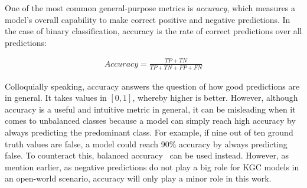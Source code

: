 One of the most common general-purpose metrics is \emph{accuracy}, which measures a model's overall capability to make correct positive and negative predictions. In the case of binary classification, accuracy is the rate of correct predictions over all predictions:

\begin{align}
    Accuracy = \frac{TP + TN}{TP + TN + FP + FN}
    \label{eq:2_basics/2_metrics/1_accuracy/accuracy}
\end{align}

Colloquially speaking, accuracy answers the question of how good predictions are in general. It takes values in $[0, 1]$, whereby higher is better. However, although accuracy is a useful and intuitive metric in general, it can be misleading when it comes to unbalanced classes because a model can simply reach high accuracy by always predicting the predominant class. For example, if nine out of ten ground truth values are false, a model could reach 90\% accuracy by always predicting false. To counteract this, balanced accuracy~\cite{Mower2005PREPMtPR} can be used instead. However, as mention earlier, as negative predictions do not play a big role for KGC models in an open-world scenario, accuracy will only play a minor role in this work.
